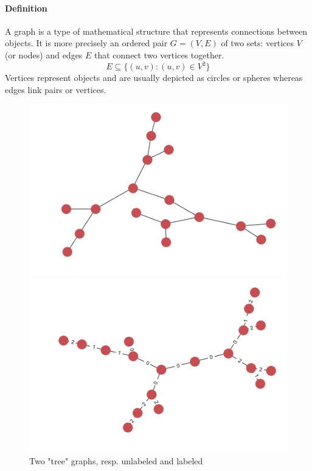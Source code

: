 \documentclass{article}
\theoremstyle{definition}
\begin{document}
\paragraph{Definition}
A graph\cite{bondy1976graph} is a type of mathematical structure that represents connections between objects. It is more precisely an ordered pair $G=(V,E)$ of two sets: vertices $V$ (or nodes) and edges $E$ that connect two vertices together.
\begin{equation}
	E \subseteq \{(u,v) : (u,v) \in V^2\}
\end{equation}
Vertices represent objects and are usually depicted as circles or spheres whereas edges link pairs or vertices. 
\begin{figure}[!htb]
\begin{multicols}{2}
    \includegraphics[width=\linewidth]{data/graphs/big_graph_no_label.png}\par
    \includegraphics[width=\linewidth]{data/graphs/big_graph_label.png}\par
\end{multicols}
\caption{Two "tree" graphs, resp. unlabeled and labeled}
\end{figure}
\end{document}
